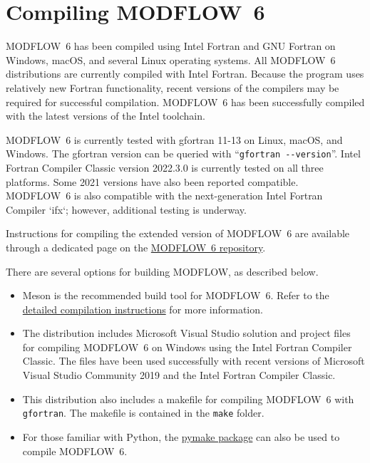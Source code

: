 \documentclass[11pt,twoside,twocolumn]{usgsreport}
\begin{document}
\section{Compiling MODFLOW~6}
MODFLOW~6 has been compiled using Intel Fortran and GNU Fortran on Windows, macOS, and several Linux operating systems. All MODFLOW~6 distributions are currently compiled with Intel Fortran. Because the program uses relatively new Fortran functionality, recent versions of the compilers may be required for successful compilation. MODFLOW~6 has been successfully compiled with the latest versions of the Intel toolchain.

MODFLOW~6 is currently tested with gfortran 11-13 on Linux, macOS, and Windows. The gfortran version can be queried with ``\verb|gfortran --version|''.  Intel Fortran Compiler Classic version 2022.3.0 is currently tested on all three platforms. Some 2021 versions have also been reported compatible. MODFLOW~6 is also compatible with the next-generation Intel Fortran Compiler `ifx`; however, additional testing is underway.

Instructions for compiling the extended version of MODFLOW~6 are available through a dedicated page on the \href{https://github.com/MODFLOW-ORG/modflow6/wiki/Extended-MODFLOW-User-Guide}{MODFLOW~6 repository}.

There are several options for building MODFLOW, as described below.

\begin{itemize}

\item Meson is the recommended build tool for MODFLOW~6.  Refer to the \href{https://github.com/MODFLOW-ORG/modflow6/blob/develop/DEVELOPER.md#building}{detailed compilation instructions} for more information.

\item The distribution includes Microsoft Visual Studio solution and project files for compiling MODFLOW~6 on Windows using the Intel Fortran Compiler Classic.  The files have been used successfully with recent versions of Microsoft Visual Studio Community 2019 and the Intel Fortran Compiler Classic.

\item This distribution also includes a makefile for compiling MODFLOW~6 with \texttt{gfortran}.  The makefile is contained in the \texttt{make} folder.

\item For those familiar with Python, the \href{https://github.com/modflowpy/pymake}{pymake package} can also be used to compile MODFLOW~6.

\end{itemize}
\end{document}
